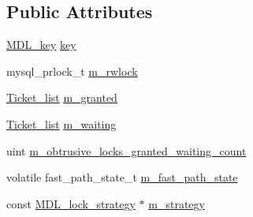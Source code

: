 \subsection*{Public Attributes}
\begin{DoxyCompactItemize}
\item 
\mbox{\hyperlink{structMDL__key}{M\+D\+L\+\_\+key}} \mbox{\hyperlink{classMDL__lock_aefb48179bc3f6ef64c213b253c379da4}{key}}
\item 
mysql\+\_\+prlock\+\_\+t \mbox{\hyperlink{classMDL__lock_a1308b4506d8cb6d754b4f173e3aa4962}{m\+\_\+rwlock}}
\item 
\mbox{\hyperlink{classMDL__lock_1_1Ticket__list}{Ticket\+\_\+list}} \mbox{\hyperlink{classMDL__lock_a188dd53561f6cf6148277512b706ea74}{m\+\_\+granted}}
\item 
\mbox{\hyperlink{classMDL__lock_1_1Ticket__list}{Ticket\+\_\+list}} \mbox{\hyperlink{classMDL__lock_a4443cad6b484e2af5c816949ddb209dc}{m\+\_\+waiting}}
\item 
uint \mbox{\hyperlink{classMDL__lock_a7ef26eb4cf46309c494135291a82e20c}{m\+\_\+obtrusive\+\_\+locks\+\_\+granted\+\_\+waiting\+\_\+count}}
\item 
volatile fast\+\_\+path\+\_\+state\+\_\+t \mbox{\hyperlink{classMDL__lock_ae680877b7079a862d294ccbefed6372c}{m\+\_\+fast\+\_\+path\+\_\+state}}
\item 
const \mbox{\hyperlink{structMDL__lock_1_1MDL__lock__strategy}{M\+D\+L\+\_\+lock\+\_\+strategy}} $\ast$ \mbox{\hyperlink{classMDL__lock_a67a214605da83d57ac8d69c1f1c4854d}{m\+\_\+strategy}}
\end{DoxyCompactItemize}
